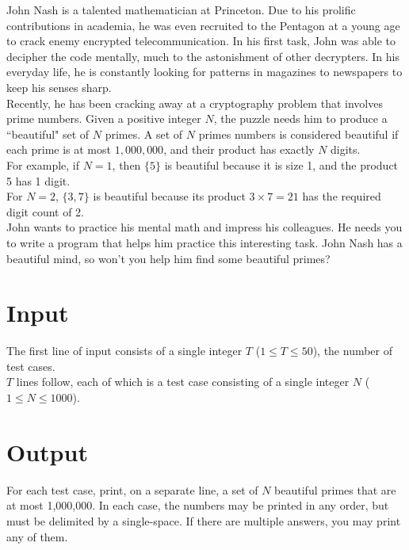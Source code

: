
\noindent John Nash is a talented mathematician at Princeton. Due to his prolific contributions in academia, he was even recruited to the Pentagon at a young age to crack enemy encrypted telecommunication. In his first task, John was able to decipher the code mentally, much to the astonishment of other decrypters. In his everyday life, he is constantly looking for patterns in magazines to newspapers to keep his senses sharp.\\

Recently, he has been cracking away at a cryptography problem that involves prime numbers. Given a positive integer $N$, the puzzle needs him to produce a ``beautiful" set of $N$ primes. A set of $N$ primes numbers is considered beautiful if each prime is at most $1,000,000$, and their product has exactly $N$ digits.\\

For example, if $N = 1$, then $\{5\}$ is beautiful because it is size 1, and the product 5 has 1 digit.\\

For $N = 2$, $\{3, 7\}$ is beautiful because its product $3 \times 7 = 21$ has the required digit count of 2.\\

John wants to practice his mental math and impress his colleagues. He needs you to write a program that helps him practice this interesting task. John Nash has a beautiful mind, so won't you help him find some beautiful primes?

\section*{Input}
The first line of input consists of a single integer $T$ ($1 \leq T \leq 50$), the number of test cases.\\
$T$ lines follow, each of which is a test case consisting of a single integer $N$ ($1 \leq N \leq 1000$).

\section*{Output}
For each test case, print, on a separate line, a set of $N$ beautiful primes that are at most 1,000,000. In each case, the numbers may be printed in any order, but must be delimited by a single-space. If there are multiple answers, you may print any of them.\\
